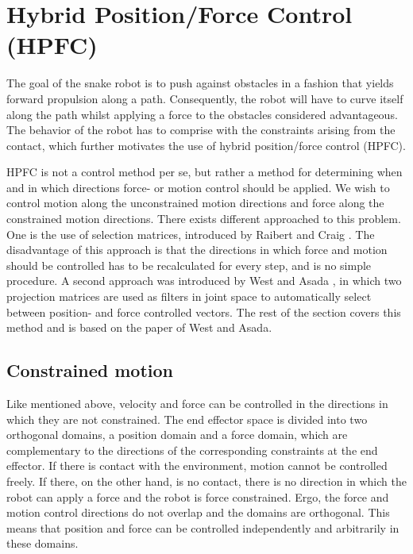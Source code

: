 \section{Hybrid Position/Force Control (HPFC)}

The goal of the snake robot is to push against obstacles in a fashion that yields forward propulsion along a path. Consequently, the robot will have to curve itself along the path whilst applying a force to the obstacles considered advantageous. The behavior of the robot has to comprise with the constraints arising from the contact, which further motivates the use of hybrid position/force control (HPFC).

HPFC is not a control method per se, but rather a method for determining when and in which directions force- or motion control should be applied. We wish to control motion along the unconstrained motion directions and force along the constrained motion directions. There exists different approached to this problem. One is the use of selection matrices, introduced by Raibert and Craig \cite{raibert1981hybrid}. The disadvantage of this approach is that the directions in which force and motion should be controlled has to be recalculated for every step, and is no simple procedure. A second approach was introduced by West and Asada \cite{west1985method}, in which two projection matrices are used as filters in joint space to automatically select between position- and force controlled vectors. The rest of the section covers this method and is based on the paper of West and Asada.

\subsection{Constrained  motion}\label{subseq:HPFC}
Like mentioned above, velocity and force can be controlled in the directions in which they are not constrained. The end effector space is divided into two orthogonal domains, a position domain and a force domain, which are complementary to the directions of the corresponding constraints at the end effector. If there is contact with the environment, motion cannot be controlled freely. If there, on the other hand, is no contact, there is no direction in which the robot can apply a force and the robot is force constrained. Ergo, the force and motion control directions do not overlap and the domains are orthogonal. This means that position and force can be controlled independently and arbitrarily in these domains.

